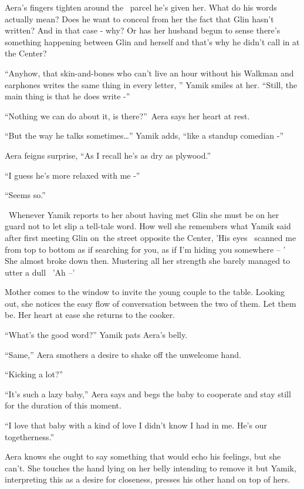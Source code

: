 \documentclass[twoside,11pt]{book}
\begin{document}
Aera's fingers tighten around the \ parcel he's given her. What do his words actually mean? Does he want to conceal from
her the fact that Glin hasn't written? And in that case - why? Or has her husband begun to sense there's something
happening between Glin and herself and that's why he didn't call in at the Center?

``Anyhow, that skin-and-bones who can't live an hour without his Walkman and earphones writes the same
thing in every letter, '' Yamik smiles at her. ``Still, the main thing is that he does write
-''

``Nothing we can do about it, is there?''~Aera says her heart at rest.

``But the way he talks sometimes{\dots}'' Yamik adds, ``like a standup comedian
-''

Aera feigns surprise, ``As I recall he's as dry as plywood.''

``I guess he's more relaxed with me -''

``Seems so.''

\ Whenever Yamik reports to her about having met Glin she must be on her guard not to let slip a tell-tale word. How
well she remembers what Yamik said after first meeting Glin on~the street opposite the Center, 'His eyes \ scanned me
from top to bottom as if searching for you, as if I'm hiding you somewhere -- ' She almost broke down then. Mustering
all her strength she barely managed to utter a dull~ 'Ah --'

Mother comes to the window to invite the young couple to the table. Looking out, she{ }notices the easy
flow of conversation between the two of them. Let them be. Her heart at ease she returns to the cooker.

``What's the good word?'' Yamik pats Aera's belly.

``Same,'' Aera smothers a desire to shake off the unwelcome hand.

``Kicking a lot?''

``It's such a lazy baby,'' Aera says and begs the baby to cooperate and stay still for the
duration of this moment.

``I love that baby with a kind of love I didn't know I had in me. He's our togetherness.''

Aera knows she ought to say something that would echo his feelings, but she can't. She touches the hand lying on her
belly intending to remove it but Yamik, interpreting this as a desire for closeness, presses his other hand on top of
hers. ~
\end{document}
